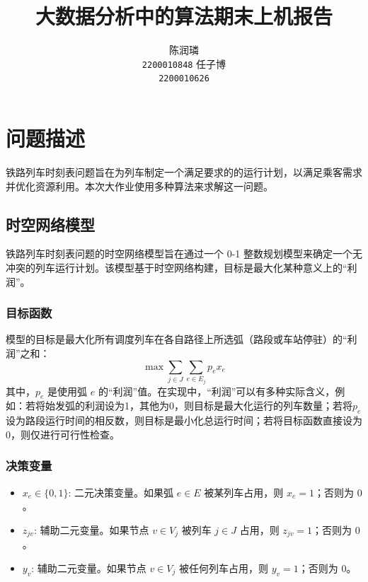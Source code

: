 \documentclass{article}
\title{大数据分析中的算法期末上机报告}
\author{
    \large 陈润璘 \\
    \large \texttt{2200010848}
    \And
    \large 任子博 \\
    \large \texttt{2200010626}
}
\begin{document}
    \maketitle


    \section{问题描述}
    铁路列车时刻表问题旨在为列车制定一个满足要求的的运行计划，以满足乘客需求并优化资源利用。本次大作业使用多种算法来求解这一问题。

    \subsection{时空网络模型}\label{subsec:spatial-temporal-network-model}

    铁路列车时刻表问题的时空网络模型旨在通过一个 0-1 整数规划模型来确定一个无冲突的列车运行计划。该模型基于时空网络构建，目标是最大化某种意义上的“利润”。

    \subsubsection{目标函数}
    模型的目标是最大化所有调度列车在各自路径上所选弧（路段或车站停驻）的“利润”之和：
    \begin{equation}
        \max \sum_{j \in J} \sum_{e \in E_j} p_e x_e\label{eq:obj}
    \end{equation}
    其中，$p_e$ 是使用弧 $e$
    的“利润”值。在实现中，“利润”可以有多种实际含义，例如：若将始发弧的利润设为1，其他为0，则目标是最大化运行的列车数量；若将$p_e$设为路段运行时间的相反数，则目标是最小化总运行时间；若将目标函数直接设为0，则仅进行可行性检查。

    \subsubsection{决策变量}
    \begin{itemize}
        \item $x_e \in \{0,1\}$: 二元决策变量。如果弧 $e \in E$ 被某列车占用，则 $x_e = 1$；否则为 $0$。
        \item $z_{jv}$: 辅助二元变量。如果节点 $v \in V_j$ 被列车 $j \in J$ 占用，则
        $z_{jv} = 1$；否则为 $0$。
        \item $y_v$: 辅助二元变量。如果节点 $v \in V_j$ 被任何列车占用，则 $y_v = 1$；否则为 $0$。
    \end{itemize}
\end{document}
